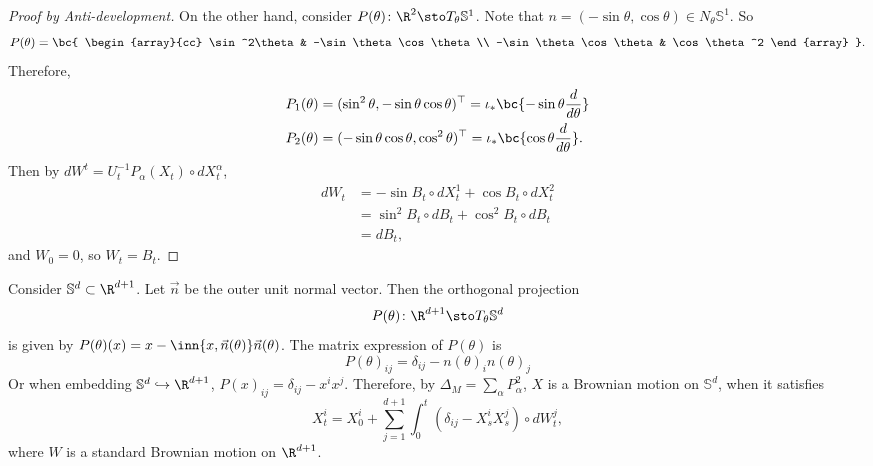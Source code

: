 \begin{exam}[Circle]
\begin{proof}[Proof by Anti-development]
        On the other hand, consider $P(\theta) \colon \R^2 \sto T_\theta \mathbb{S}^1$. Note that $n = (-\sin \theta,\cos \theta) \in N_\theta\mathbb{S}^1$. So
        \begin{equation*}
            P(\theta) = \bc{
                \begin{array}{cc}
                    \sin^2\theta & -\sin \theta \cos \theta \\
                    -\sin \theta \cos \theta & \cos \theta^2
                \end{array}
            }.
        \end{equation*}
        Therefore, 
        \begin{align*}
            P_1(\theta) &= (\sin^2\theta, -\sin \theta \cos \theta)^\top = \iota_* \bc{-\sin \theta \frac{d}{d\theta}} \\
            P_2(\theta) &= (-\sin \theta \cos \theta, \cos^2\theta )^\top = \iota_* \bc{\cos \theta \frac{d}{d\theta}}.
        \end{align*}
        Then by $dW^t = U_t^{-1}P_\alpha(X_t) \circ dX_t^\alpha$,
        \begin{align*}
            dW_t &= -\sin B_t \circ dX_t^1 + \cos B_t \circ dX^2_t \\
            &= \sin^2 B_t \circ dB_t + \cos^2 B_t\circ dB_t \\
            &= dB_t,
        \end{align*}
        and $W_0 = 0$, so $W_t = B_t$. \qedhere
    \end{proof}
\end{exam}

\begin{exam}[Sphere]
    Consider $\mathbb{S}^d \subset \R^{d+1}$. Let $\vec{n}$ be the outer unit normal vector. Then the orthogonal projection
    \begin{equation*}
        P(\theta) \colon \R^{d+1} \sto T_{\theta}\mathbb{S}^d
    \end{equation*}
    is given by $P(\theta)(x) = x - \inn{x,\vec{n}(\theta)}\vec{n}(\theta)$. The matrix expression of $P(\theta)$ is
    \begin{equation*}
        P(\theta)_{ij} = \delta_{ij} - n(\theta)_in(\theta)_j
    \end{equation*}
    Or when embedding $\mathbb{S}^d \hookrightarrow \R^{d+1}$, $P(x)_{ij} = \delta_{ij} - x^ix^j$. Therefore, by $\Delta_M = \sum_\alpha P_\alpha^2$, $X$ is a Brownian motion on $\mathbb{S}^d$, when it satisfies
    \begin{equation*}
        X^i_t = X^i_0 + \sum_{j=1}^{d+1} \int_0^t (\delta_{ij} -X_s^iX^j_s) \circ dW_t^j,
    \end{equation*}
    where $W$ is a standard Brownian motion on $\R^{d+1}$.
\end{exam}


